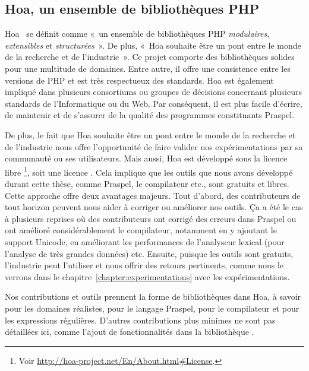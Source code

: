 \subsection{Hoa, un ensemble de bibliothèques PHP}
\label{subsection:tools:hoa}

Hoa~ se définit comme «~un ensemble de bibliothèques PHP {\em
modulaires}, {\em extensibles} et {\em structurées}~». De plus, «~Hoa souhaite
être un pont entre le monde de la recherche et de l'industrie~». Ce projet
comporte des bibliothèques solides pour une multitude de domaines. Entre autre,
il offre une consistence entre les versions de PHP et est très respectueux des
standards. Hoa est également impliqué dans plusieurs consortiums ou groupes de
décisions concernant plusieurs standards de l'Informatique ou du Web. Par
conséquent, il est plus facile d'écrire, de maintenir et de s'assurer de la
qualité des programmes constituants Praspel.

De plus, le fait que Hoa souhaite être un pont entre le monde de la recherche et
de l'industrie nous offre l'opportunité de faire valider nos expérimentations
par sa communauté ou ses utilisateurs. Mais aussi, Hoa est développé sous la
licence libre \footnote{Voir
\url{http://hoa-project.net/En/About.html\#License}.}, soit une licence
. Cela implique que les outils que nous avons développé
durant cette thèse, comme Praspel, le compilateur etc., sont gratuits et libres.
Cette approche offre deux avantages majeurs. Tout d'abord, des contributeurs de
tout horizon peuvent nous aider à corriger ou améliorer nos outils. Ça a été le
cas à plusieurs reprises où des contributeurs ont corrigé des erreurs dans
Praspel ou ont amélioré considérablement le compilateur, notamment en y ajoutant
le support Unicode, en améliorant les performances de l'analyseur lexical (pour
l'analyse de très grandes données) etc. Ensuite, puisque les outils sont
gratuits, l'industrie peut l'utiliser et nous offrir des retours pertinents,
comme nous le verrons dans le chapitre~\ref{chapter:experimentations} avec les
expérimentations.

Nos contributions et outils prennent la forme de bibliothèques dans Hoa, à
savoir  pour les domaines réalistes,
 pour le langage Praspel, 
pour le compilateur et  pour les expressions régulières.
D'autres contributions plus minimes ne sont pas détaillées ici, comme l'ajout de
fonctionnalités dans la bibliothèque .

